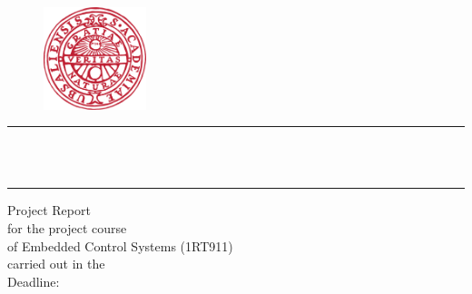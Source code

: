
\begin{titlepage}

\begin{minipage}{\linewidth}
	\centering
    \begin{minipage}{0.49\linewidth}
    	\begin{figure}[H]
        	\hfill\includegraphics[width=3cm]{./fig/uppsala_university.png}
		\end{figure}
	\end{minipage}
	\hfill
	\begin{minipage}{0.49\linewidth}
    	\vspace*{0.5cm}
    	\begin{huge}
    		\myuniversity\hfill
		\end{huge}
	\end{minipage}
\end{minipage}

\vspace*{3em}
\begin{center}
  \noindent\rule{\textwidth}{1pt}
  \vspace*{0.3em}\\
  \huge\mytitle \\
  \noindent\rule{\textwidth}{1pt}

  \vspace*{0.3em}
  \Large%
  {
    Project Report
    \vspace*{0.5cm}\\
    for the project course\\
    of Embedded Control Systems (1RT911)\\
    carried out in the \myperiod\\
    \vspace*{3em}
    Deadline: \myduedate
  }


\end{center}
\end{titlepage}
